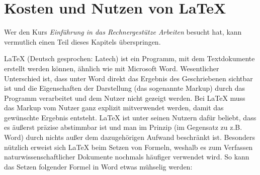 \section{Kosten und Nutzen von LaTeX}
Wer den Kurs \textit{Einführung in das Rechnergestütze Arbeiten} besucht hat, kann vermutlich einen Teil dieses Kapitels überspringen.

LaTeX (Deutsch gesprochen: \glqq Latech\grqq) ist ein Programm, mit dem Textdokumente erstellt werden können, ähnlich wie mit Microsoft Word. Wesentlicher Unterschied ist, dass unter Word direkt das Ergebnis des Geschriebenen sichtbar ist und die Eigenschaften der Darstellung (das sogenannte Markup) durch das Programm verarbeitet und dem Nutzer nicht gezeigt werden. Bei LaTeX muss das Markup vom Nutzer ganz explizit mitverwendet werden, damit das gewünschte Ergebnis entsteht. LaTeX ist unter seinen Nutzern dafür beliebt, dass es äußerst präzise abstimmbar ist und man im Prinzip (im Gegensatz zu z.B. Word) durch nichts außer dem dazugehörigen Aufwand beschränkt ist.
Besonders nützlich erweist sich LaTeX beim Setzen von Formeln, weshalb es zum Verfassen naturwissenschaftlicher Dokumente nochmals häufiger verwendet wird. So kann das Setzen folgender Formel in Word etwas mühselig werden:

